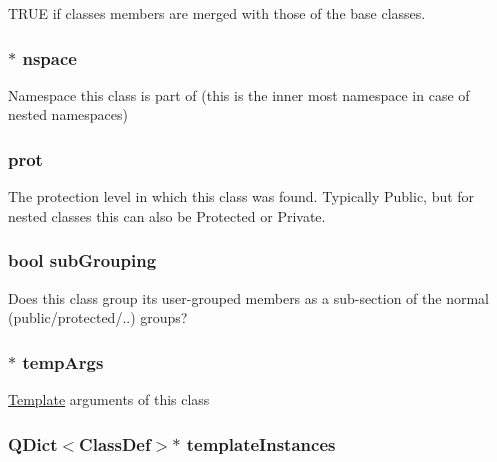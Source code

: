 T\-R\-U\-E if classes members are merged with those of the base classes. \hypertarget{class_class_def_impl_aca092109e90d350747ec9ccb7d4805c6}{
\subsubsection[{nspace}]{$\ast$ nspace}}\label{class_class_def_impl_aca092109e90d350747ec9ccb7d4805c6}
Namespace this class is part of (this is the inner most namespace in case of nested namespaces) \hypertarget{class_class_def_impl_a3f887065f93ce5f02dea21da35468e8e}{
\subsubsection[{prot}]{ prot}}\label{class_class_def_impl_a3f887065f93ce5f02dea21da35468e8e}
The protection level in which this class was found. Typically Public, but for nested classes this can also be Protected or Private. \hypertarget{class_class_def_impl_a6c0b6dfd8da3027f83dfdbfeffce7706}{
\subsubsection[{sub\-Grouping}]{\setlength{\rightskip}{0pt plus 5cm}bool sub\-Grouping}}\label{class_class_def_impl_a6c0b6dfd8da3027f83dfdbfeffce7706}
Does this class group its user-\/grouped members as a sub-\/section of the normal (public/protected/..) groups? \hypertarget{class_class_def_impl_a132135b8994a03a68bf763c6055c5a4b}{
\subsubsection[{temp\-Args}]{$\ast$ temp\-Args}}\label{class_class_def_impl_a132135b8994a03a68bf763c6055c5a4b}
\hyperlink{class_template}{Template} arguments of this class \hypertarget{class_class_def_impl_ab49b6d30520603cc9c97579a168808fd}{
\subsubsection[{template\-Instances}]{\setlength{\rightskip}{0pt plus 5cm}Q\-Dict$<${\bf Class\-Def}$>$$\ast$ template\-Instances}}\label{class_class_def_impl_ab49b6d30520603cc9c97579a168808fd}
